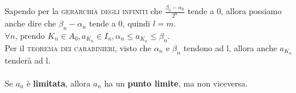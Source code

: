 \documentclass{article}
\begin{document}
Sapendo per la \textsc{gerarchia degli infiniti} che \(\frac{\beta_0 - \alpha_0}{2^n}\) tende a 0, allora possiamo anche dire che \(\beta_n - \alpha_n\) tende a 0, quindi \(l = m\).\\
\(\forall n\), prendo \(K_n \in A_0, a_{K_n} \in I_n, \alpha_n \leq a_{K_n} \leq \beta_n\).\\
Per il \textsc{teorema dei carabinieri}, visto che \(\alpha_n\) e \(\beta_n\) tendono ad l, allora anche \(a_{K_n}\) tenderà ad l.\\\\
Se \(a_n\) è \textbf{limitata}, allora \(a_n\) ha un \textbf{punto limite}, ma non viceversa.
\end{document}
